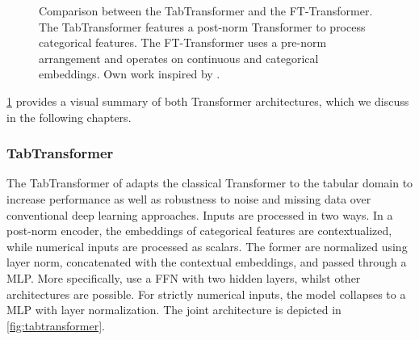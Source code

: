 \begin{figure}[ht]
    \hfill
    \hfill
    \hfill\null
    \caption[Comparison Between Tabular Transformer.]{Comparison between the TabTransformer and the FT-Transformer. The TabTransformer features a post-norm Transformer to process categorical features. The FT-Transformer uses a pre-norm arrangement and operates on continuous and categorical embeddings. Own work inspired by \textcites[][2]{huangTabTransformerTabularData2020}[][4--5]{gorishniyRevisitingDeepLearning2021}.}
    \label{fig:tabular-transformer}
\end{figure}

\cref{fig:tabular-transformer} provides a visual summary of both Transformer architectures, which we discuss in the following chapters.

\subsubsection{TabTransformer}\label{sec:tabtransformer}

The TabTransformer of \textcite[][4]{huangTabTransformerTabularData2020} adapts the classical Transformer to the tabular domain to increase performance as well as robustness to noise and missing data over conventional deep learning approaches. Inputs are processed in two ways. In a post-norm encoder, the embeddings of categorical features are contextualized, while numerical inputs are processed as scalars. The former are normalized using layer norm, concatenated with the contextual embeddings, and passed through a \gls{MLP}. More specifically, \textcite[][4--12]{huangTabTransformerTabularData2020} use a \gls{FFN} with two hidden layers, whilst other architectures are possible. For strictly numerical inputs, the model collapses to a \gls{MLP} with layer normalization. The joint architecture is depicted in \cref{fig:tabtransformer}.


